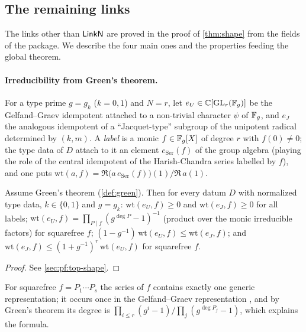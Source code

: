 \subsection{The remaining links}\label{sec:families:links}

The links other than $\mathsf{LinkN}$ are proved in the proof of \cref{thm:shape} from the fields of the package.
We describe the four main ones and the properties feeding the global theorem.

\paragraph{Irreducibility from Green's theorem.}
For a type prime $g=g_k$ ($k=0,1$) and $N=r$, let $e_U\in\mathbb{C}[\operatorname{GL}_r(\mathbb{F}_g)]$ be the Gelfand--Graev idempotent
attached to a non-trivial character $\psi$ of $\mathbb{F}_g$, and $e_J$ the analogous idempotent of a ``Jacquet-type''
subgroup of the unipotent radical determined by $(k,m)$. A \emph{label} is a monic $f\in\mathbb{F}_g[X]$ of degree $r$
with $f(0)\ne0$; the type data of $D$ attach to it an element $e_{\mathrm{Ser}}(f)$ of the group algebra (playing
the role of the central idempotent of the Harish-Chandra series labelled by $f$), and one puts
$\mathrm{wt}(a,f)=\Re\bigl(a\,e_{\mathrm{Ser}}(f)\bigr)(1)/\Re\,a(1)$.

\begin{proposition}\Fmark\label{prop:families:admLq}
Assume Green's theorem (\cref{def:green}). Then for every datum $D$ with normalized type data, $k\in\{0,1\}$ and
$g=g_k$: $\mathrm{wt}(e_U,f)\ge0$ and $\mathrm{wt}(e_J,f)\ge0$ for all labels;
$\mathrm{wt}(e_U,f)=\prod_{P\mid f}(g^{\deg P}-1)^{-1}$ (product over the monic irreducible factors) for
squarefree $f$; $(1-g^{-1})\,\mathrm{wt}(e_U,f)\le\mathrm{wt}(e_J,f)$; and
$\mathrm{wt}(e_J,f)\le(1+g^{-1})^r\,\mathrm{wt}(e_U,f)$ for squarefree $f$.
\end{proposition}
\begin{proof}See \cref{sec:pf:top-shape}.
\end{proof}


For squarefree $f=P_1\cdots P_s$ the series of $f$ contains exactly one generic representation; it occurs once in
the Gelfand--Graev representation \cite{GelfandGraev1962,Zelevinsky1981}, and by Green's theorem its degree is
$\prod_{i\le r}(g^i-1)/\prod_j(g^{\deg P_j}-1)$, which explains the formula.

